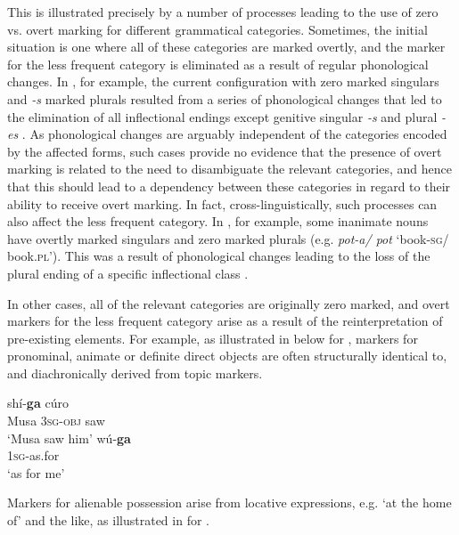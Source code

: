 \documentclass[output=paper]{langsci/langscibook}
\begin{document}
This is illustrated precisely by a number of processes leading to the
use of  zero vs. overt marking for different grammatical
categories. Sometimes, the initial situation is one where all of these
categories are marked overtly, and the marker for the less frequent
category is eliminated as a result of regular phonological changes. In , for example, the current
configuration with zero marked singulars and {\em -s} marked plurals
resulted from a series of phonological changes that led to the
elimination of all inflectional endings except genitive singular {\em
  -s} and plural {\em -es} \citep{Mosse}.
As phonological changes are
arguably independent of the categories encoded by the affected forms,
such
cases provide no evidence that the presence  of overt
marking is related to the need to disambiguate the relevant
categories, and hence that this should lead to a  dependency between
these categories in regard to their ability to
receive overt marking.
In fact, cross-linguistically, such processes can also affect the less
frequent category.  In , for example, some inanimate nouns have
overtly marked singulars and
zero marked plurals
 (e.g. {\em pot-a/ pot} `book-\textsc{sg}/ book.\textsc{pl}'). This was a result of
 phonological changes  leading to the loss of the plural ending of a
 specific inflectional class \citep{Nitz-Nordhoff2010}.

In other cases, all of the relevant categories are originally zero
marked, and overt markers for the less frequent category arise as a
result of the  reinterpretation of
pre-existing elements. For example, as illustrated in  below for
, markers for pronominal, animate or definite direct objects are
often structurally identical to, and diachronically  derived from topic
markers. 


\ea\label{kanuri}
\ea
\gll {} shí-\textbf{ga} cúro \\
Musa \textsc{3sg-obj} saw \\
\glt `Musa saw him' \citep[52]{Kanuri}
\ex
\gll wú-\textbf{ga}\\
\textsc{1sg}-as.for\\
\glt `as for me' \citep[52]{Kanuri}
\z
\z

Markers for alienable possession arise  from locative
expressions, e.g. `at the home of' and the like, as illustrated in
 for .
\end{document}

